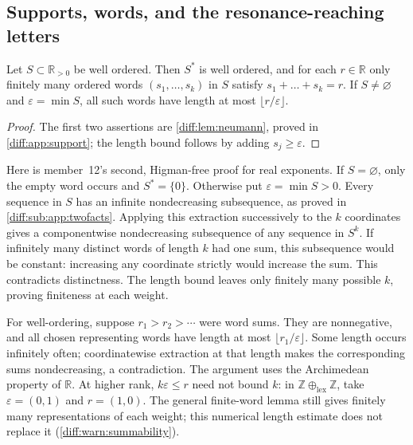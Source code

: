 \documentclass[11pt,letterpaper]{article}
\numberwithin{equation}{section}
\theoremstyle{definition}
\theoremstyle{remark}
\newcommand{\R}{\mathbb R}
\newcommand{\Z}{\mathbb Z}
\begin{document}
\subsection{Supports, words, and the resonance-reaching letters}
\label{diff:rs:sub:words}

\begin{lemma}
\label{diff:rs:lem:words}
Let $S\subset\R_{>0}$ be well ordered. Then $S^{*}$ is well ordered, and for
each $r\in\R$ only finitely many ordered words $(s_{1},\dots,s_{k})$ in $S$
satisfy $s_{1}+\dots+s_{k}=r$. If $S\neq\varnothing$ and $\varepsilon=\min S$,
all such words have length at most $\lfloor r/\varepsilon\rfloor$.
\end{lemma}
\begin{proof}
The first two assertions are \cref{diff:lem:neumann}, proved in
\cref{diff:app:support}; the length bound follows by adding
$s_{j}\geq\varepsilon$.
\end{proof}

Here is member~12's second, Higman-free proof for real exponents. If
$S=\varnothing$, only the empty word occurs and $S^{*}=\{0\}$. Otherwise
put $\varepsilon=\min S>0$. Every sequence in $S$ has an infinite
nondecreasing subsequence, as proved in \cref{diff:sub:app:twofacts}.
Applying this extraction successively to the $k$ coordinates gives a
componentwise nondecreasing subsequence of any sequence in $S^{k}$.
If infinitely many distinct words of length $k$ had one sum, this
subsequence would be constant: increasing any coordinate strictly would
increase the sum. This contradicts distinctness. The length bound leaves
only finitely many possible $k$, proving finiteness at each weight.

For well-ordering, suppose $r_{1}>r_{2}>\cdots$ were word sums. They are
nonnegative, and all chosen representing words have length at most
$\lfloor r_{1}/\varepsilon\rfloor$. Some length occurs infinitely often;
coordinatewise extraction at that length makes the corresponding sums
nondecreasing, a contradiction. The argument uses the Archimedean
property of $\R$. At higher rank, $k\varepsilon\leq r$ need not bound
$k$: in $\Z\oplus_{\mathrm{lex}}\Z$, take $\varepsilon=(0,1)$ and
$r=(1,0)$. The general finite-word lemma still gives finitely many
representations of each weight; this numerical length estimate does not
replace it (\cref{diff:warn:summability}).
\end{document}
